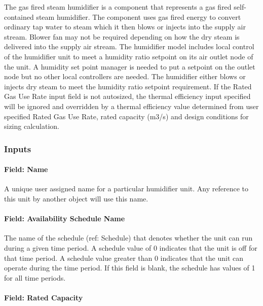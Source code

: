 The gas fired steam humidifier is a component that represents a gas fired self-contained steam humidifier. The component uses gas fired energy to convert ordinary tap water to steam which it then blows or injects into the supply air stream. Blower fan may not be required depending on how the dry steam is delivered into the supply air stream. The humidifier model includes local control of the humidifier unit to meet a humidity ratio setpoint on its air outlet node of the unit. A humidity set point manager is needed to put a setpoint on the outlet node but no other local controllers are needed. The humidifier either blows or injects dry steam to meet the humidity ratio setpoint requirement. If the Rated Gas Use Rate input field is not autosized, the thermal efficiency input specified will be ignored and overridden by a thermal efficiency value determined from user specified Rated Gas Use Rate, rated capacity (m3/s) and design conditions for sizing calculation.

\subsubsection{Inputs}\label{inputs-1-021}

\paragraph{Field: Name}\label{field-name-1-020}

A unique user assigned name for a particular humidifier unit. Any reference to this unit by another object will use this name.

\paragraph{Field: Availability Schedule Name}\label{field-availability-schedule-name-1-008}

The name of the schedule (ref: Schedule) that denotes whether the unit can run during a given time period. A schedule value of 0 indicates that the unit is off for that time period. A schedule value greater than 0 indicates that the unit can operate during the time period. If this field is blank, the schedule has values of 1 for all time periods.

\paragraph{Field: Rated Capacity}\label{field-rated-capacity-1}

